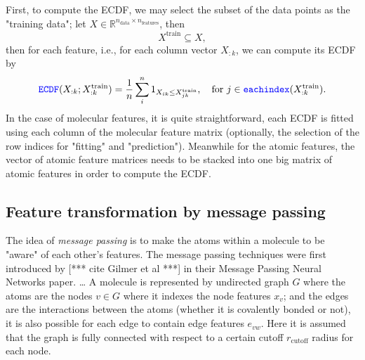 \documentclass[12pt]{article}
\def\att{                    %
        \marginpar[ \hspace*{\fill} \raisebox{-0.2em}{\rule{2mm}{1.2em}} ]
        {\raisebox{-0.2em}{\rule{2mm}{1.2em}} }
        }
\def\at#1{[*** \att #1 ***]}  %
\begin{document}
First, to compute the ECDF, we may select the subset of the data points as the "training data"; 
let $X \in \mathbb{R}^{n_\text{data} \times n_\text{features}}$, then
\begin{equation*}
	X^\text{train} \subseteq X,
\end{equation*}
then for each feature, i.e., for each column vector $X_{:k}$, we can compute its ECDF by 
\begin{equation}
	\codeword{ECDF}(X_{:k}; X_{:k}^\text{train}) = \frac{1}{n} \sum_{i}^n 1_{X_{ik} \leq X^\text{train}_{jk}}, ~~ \text{ for }j \in \codeword{eachindex}(X^\text{train}_{:k}).
	\label{eq:ecdf}
\end{equation}
In the case of molecular features, it is quite straightforward, each ECDF is fitted using each column of the molecular feature matrix (optionally, the selection of the row indices for "fitting" and "prediction"). 
Meanwhile for the atomic features, the vector of atomic feature matrices needs to be stacked into one big matrix of atomic features in order to compute the ECDF.

\subsection{Feature transformation by message passing}
The idea of \textit{message passing} is to make the atoms within a molecule to be "aware" of each other's features.  
The message passing techniques were first introduced by \at{cite Gilmer et al} in their Message Passing Neural Networks paper. 
\dots
A molecule is represented by undirected graph $G$ where the atoms are the nodes $v \in G$ where it indexes the node features $x_v$; and the edges are the interactions between the atoms (whether it is covalently bonded or not), it is also possible for each edge to contain edge features $e_{vw}$. Here it is assumed that the graph is fully connected with respect to a certain cutoff $r_\text{cutoff}$ radius for each node.
\end{document}
